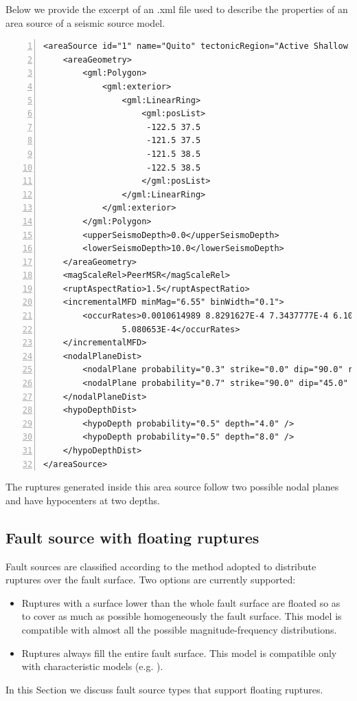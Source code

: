 Below we provide the excerpt of an .xml file used to describe the properties of
an area source of a seismic source model.
\begin{Verbatim}[frame=single, commandchars=\\\{\}, fontsize=\footnotesize,
numbers=left, numbersep=2pt]
<areaSource id="1" name="Quito" tectonicRegion="Active Shallow Crust">
    <areaGeometry>
        <gml:Polygon>
            <gml:exterior>
                <gml:LinearRing>
                    <gml:posList>
                     -122.5 37.5
                     -121.5 37.5
                     -121.5 38.5
                     -122.5 38.5
                    </gml:posList>
                </gml:LinearRing>
            </gml:exterior>
        </gml:Polygon>
        <upperSeismoDepth>0.0</upperSeismoDepth>
        <lowerSeismoDepth>10.0</lowerSeismoDepth>
    </areaGeometry>
    <magScaleRel>PeerMSR</magScaleRel>
    <ruptAspectRatio>1.5</ruptAspectRatio>
    <incrementalMFD minMag="6.55" binWidth="0.1">
        <occurRates>0.0010614989 8.8291627E-4 7.3437777E-4 6.108288E-4 
				5.080653E-4</occurRates>
    </incrementalMFD>
    <nodalPlaneDist>
        <nodalPlane probability="0.3" strike="0.0" dip="90.0" rake="0.0"/>
        <nodalPlane probability="0.7" strike="90.0" dip="45.0" rake="90.0"/>
    </nodalPlaneDist>
    <hypoDepthDist>
        <hypoDepth probability="0.5" depth="4.0" />
        <hypoDepth probability="0.5" depth="8.0" />
    </hypoDepthDist>
</areaSource>
\end{Verbatim}
The ruptures generated inside this area source follow two possible nodal 
planes and have hypocenters at two depths. 
%
\subsection{Fault source with floating ruptures}
%
Fault sources are classified according to the method adopted to 
distribute ruptures over the fault surface. Two options are currently 
supported: 
\begin{itemize}
    \item Ruptures with a surface lower than the whole fault surface are 
        floated so as to cover as much as possible homogeneously the fault
        surface.
        This model is compatible with almost all the possible 
        magnitude-frequency distributions.
    \item Ruptures always fill the entire fault surface. This model is 
        compatible only with characteristic models (e.g.  
        \cite{schwartz1984}).
\end{itemize}
In this Section we discuss fault source types that support floating ruptures.
%
